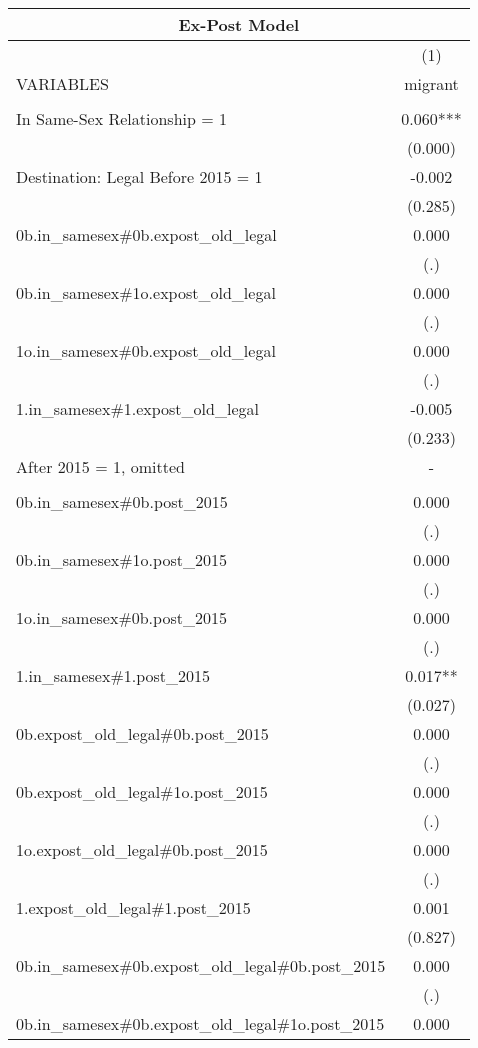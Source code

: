 \documentclass[]{article}
\begin{document}
\begin{tabular}{lc}
\multicolumn{2}{c}{Ex-Post Model} \\ \hline
 & (1) \\
VARIABLES & migrant \\ \hline
 &  \\
In Same-Sex Relationship = 1 & 0.060*** \\
 & (0.000) \\
Destination: Legal Before 2015 = 1 & -0.002 \\
 & (0.285) \\
0b.in\_samesex\#0b.expost\_old\_legal & 0.000 \\
 & (.) \\
0b.in\_samesex\#1o.expost\_old\_legal & 0.000 \\
 & (.) \\
1o.in\_samesex\#0b.expost\_old\_legal & 0.000 \\
 & (.) \\
1.in\_samesex\#1.expost\_old\_legal & -0.005 \\
 & (0.233) \\
After 2015 = 1, omitted & - \\
 &  \\
0b.in\_samesex\#0b.post\_2015 & 0.000 \\
 & (.) \\
0b.in\_samesex\#1o.post\_2015 & 0.000 \\
 & (.) \\
1o.in\_samesex\#0b.post\_2015 & 0.000 \\
 & (.) \\
1.in\_samesex\#1.post\_2015 & 0.017** \\
 & (0.027) \\
0b.expost\_old\_legal\#0b.post\_2015 & 0.000 \\
 & (.) \\
0b.expost\_old\_legal\#1o.post\_2015 & 0.000 \\
 & (.) \\
1o.expost\_old\_legal\#0b.post\_2015 & 0.000 \\
 & (.) \\
1.expost\_old\_legal\#1.post\_2015 & 0.001 \\
 & (0.827) \\
0b.in\_samesex\#0b.expost\_old\_legal\#0b.post\_2015 & 0.000 \\
 & (.) \\
0b.in\_samesex\#0b.expost\_old\_legal\#1o.post\_2015 & 0.000 \\

\end{tabular}
\end{document}
